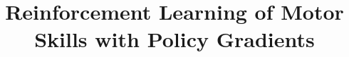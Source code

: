 \newcommand{\ibkt}{\langle\alpha,e_{i}\rangle}
\newcommand{\bla}{\bigl\langle}
\newcommand{\bra}{\bigr\rangle}
\newcommand{\ov}{\overline}
\newcommand{\obkt}{\langle\alpha,e_{1}\rangle}
\newcommand{\abkt}{\langle\alpha,e_{j}\rangle}
\newcommand{\hlf}{\textstyle{\frac{1}{2}}}
\newcommand{\thrd}{\textstyle{\frac{1}{3}}}
\newcommand{\fth}{\textstyle{\frac{1}{5}}}
\newcommand{\sixth}{\textstyle{\frac{1}{6}}}
\newcommand{\norm}[1]{\lVert#1\rVert}
\newcommand{\mbs}{\boldsymbol}
\newcommand{\inv}{\operatorname{inv}}

\renewcommand{\top}{\mathsf{T}}		%
\newcommand{\cop}[1]{\overline{#1}}	%
\newcommand{\hop}{\mathsf{H}}		%
\newcommand{\dop}{\mathsf{\dag}}		%


\theoremheaderfont{\scshape}
\newtheorem{lemma}{Lemma}
\newtheorem{theorem}{Theorem}
\newtheorem{define}{Definition}
\newtheorem{Cor}{Corollary}
\newtheorem{Ass}{Assumption}
\newtheorem{Prop}{Proposition}
\newtheorem{algorithm}{Algorithm}%
{\theorembodyfont{\rmfamily}
\newtheorem{Rem}{Remark}}
\newtheorem{Obs}{Fact}
\newenvironment{proof}{\noindent{\sc
Proof (Sketch).}\,\,}{\hfill\linebreak[0]\hspace*{\fill}}

\title{\Huge Reinforcement Learning of Motor Skills with Policy Gradients}


